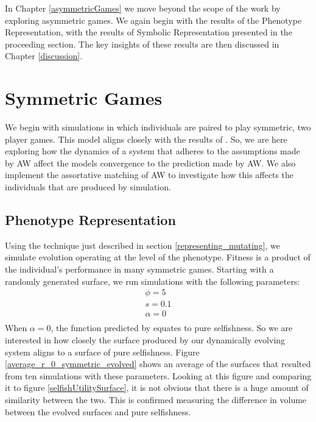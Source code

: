 \documentclass[11pt]{book}
\newcommand*{\np}{\par\noindent\newline}
\begin{document}
\np In Chapter \ref{asymmetricGames} we move beyond the scope of the \citeauthor{alger_generalization_2012} work by exploring asymmetric games.
We again begin with the results of the Phenotype Representation, with the results of Symbolic Representation presented in the proceeding section.
The key insights of these results are then discussed in Chapter \ref{discussion}.


\chapter{Symmetric Games}\label{symmetricGames}

We begin with simulations in which individuals are paired to play symmetric, two player games.
This model aligns closely with the results of \citet{alger_generalization_2012}.
So, we are here exploring how the dynamics of a system that adheres to the assumptions made by AW affect the models convergence to the prediction made by AW.
We also implement the assortative matching of AW to investigate how this affects the individuals that are produced by simulation.

\section{Phenotype Representation}\label{symmetricGames_pheno}
Using the technique just described in section \ref{representing_mutating}, we simulate evolution operating at the level of the phenotype.
Fitness is a product of the individual's performance in many symmetric games.
Starting with a randomly generated surface, we run simulations with the following parameters:
\begin{gather*}
	\phi = 5\\
	s = 0.1\\
	\alpha = 0\\
\end{gather*}
\noindent When $\alpha = 0$, the function predicted by \citet{alger_generalization_2012} equates to pure selfishness.
So we are interested in how closely the surface produced by our dynamically evolving system aligns to a surface of pure selfishness.
Figure \ref{average_r_0_symmetric_evolved} shows an average of the surfaces that resulted from ten simulations with these parameters.
Looking at this figure and comparing it to figure \ref{selfishUtilitySurface}, it is not obvious that there is a huge amount of similarity between the two.
This is confirmed measuring the difference in volume between the evolved surfaces and pure selfishness. 
\end{document}
